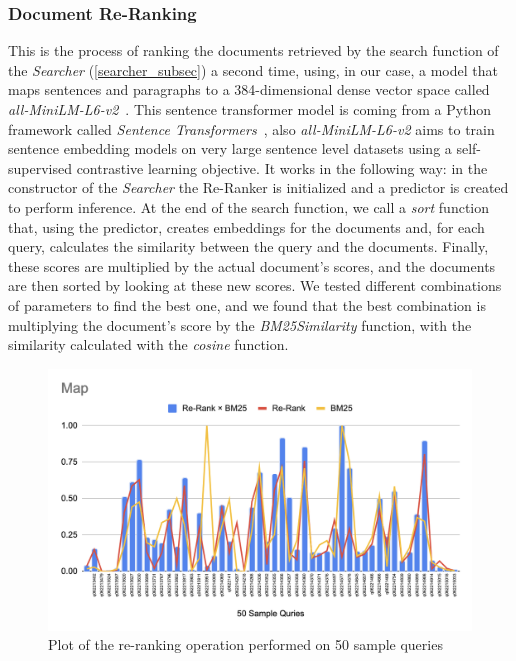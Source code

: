 \subsubsection{Document Re-Ranking}
This is the process of ranking the documents retrieved by the search function of the \textit{Searcher} (\ref{searcher_subsec}) a second time, using, in our case, a model that maps sentences and paragraphs to a 384-dimensional dense vector space called \textit{all-MiniLM-L6-v2}~\cite{huggingfaceallminilml6v2}. This sentence transformer model is coming from a Python framework called \textit{Sentence Transformers}~\cite{sentence-transformers}, also \textit{all-MiniLM-L6-v2} aims to train sentence embedding models on very large sentence level datasets using a self-supervised contrastive learning objective.
\newline
It works in the following way: in the constructor of the \textit{Searcher} the Re-Ranker is initialized and a predictor is created to perform inference. 
At the end of the search function, we call a \textit{sort} function that, using the predictor, creates embeddings for the documents and, for each query, calculates the similarity between the query and the documents.
Finally, these scores are multiplied by the actual document's scores, and the documents are then sorted by looking at these new scores.
\newline
We tested different combinations of parameters to find the best one, and we found that the best combination is multiplying the document's score by the \textit{BM25Similarity} function, with the similarity calculated with the \textit{cosine} function.
\begin{figure}[!ht]
    \centering
    \includegraphics[scale=0.45, keepaspectratio]{figure/re-ranking}
    \caption{Plot of the re-ranking operation performed on 50 sample queries}
    \label{fig:re-rankinge}
\end{figure}

